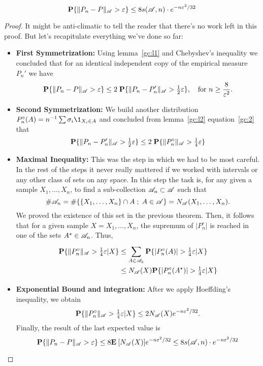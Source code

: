 \begin{theorem}\label{vc:inequality}
 \[\P\{\|P_n-P\|_{\AA} > \varepsilon\} \leq 8 s(\AA, n) \cdot e^{-n \varepsilon^2 / 32} \] 
\end{theorem}
\begin{proof}
    It might be anti-climatic to tell the reader that there's no work left in this proof. But let's recapitulate everything we've done so far:
    \begin{itemize}
        \item \textbf{First Symmetrization:} Using {lemma}~\ref{gc:l1} and Chebyshev's inequality we concluded that for an identical independent copy of the empirical measure $P_n'$ we have
        \[ \P\{\|P_n - P\|_\AA > \varepsilon\} \leq 2 \; \P\{\|P_n-P_n'\|_\AA > \tfrac{1}{2}\varepsilon\},\hspace*{1em}\text{for } n \geq \frac{8}{\varepsilon^2}.\] 
        \item \textbf{Second Symmetrization:} We build another distribution $P_n^\circ(A) = n^{-1}\sum \sigma_i \1_{X_i \in A} $ and concluded from {lemma}~\ref{gc:l2} equation~\ref{gc:2} that
        \[ \P\{\|P_n-P_n'\|_\AA > \tfrac{1}{2}\varepsilon\} \leq 2\; \P\{\|P_n^\circ\|_\AA > \tfrac{1}{4}\varepsilon\}   \]
        \item \textbf{Maximal Inequality:} This was the step in which we had to be most careful. In the rest of the steps it never really mattered if we worked with intervals or any other class of sets on any space. In this step the task is, for any given a sample $X_1, \ldots, X_n$, to find a sub-collection $\AA_n \subset \AA$ such that
        \[ \#\AA_n = \#\{\{X_1,\ldots,X_n\}\cap A \; ;\; A\in\AA\} = N_\AA(X_1,\ldots, X_n).\] 
        We proved the existence of this set in the previous theorem. Then, it follows that for a given sample $X = X_1,\ldots, X_n$, the supremum of $|P_n^\circ|$ is reached in one of the sets $A^\star \in \AA_n$. Thus,
        \[ \everymath{\displaystyle}\arraycolsep=1.4pt\def\arraystretch{1.5}
        \begin{array}{rcl}
            \P\{\|P_n^\circ\|_\AA > \tfrac{1}{4}\varepsilon | X\} & \leq & \sum_{A\in \AA_k}\P\{|P_n^\circ(A)| > \tfrac{1}{4}\varepsilon | X\} \\
            &\leq& N_\AA(X) \P\{|P_n^\circ(A^\star)| > \tfrac{1}{4}\varepsilon | X\}
       \end{array}
        \]
        \item \textbf{Exponential Bound and integration:} After we apply Hoeffding's inequality, we obtain
        \[ \P\{\|P_n^\circ\|_\AA > \tfrac{1}{4}\varepsilon | X\} \leq 2 N_\AA(X) e^{-n\varepsilon^2/32}.\]
        Finally, the result of the last expected value is 
         \[ \P\{\|P_n-P\|_\AA > \varepsilon\} \leq 8 \E[N_\AA(X)] e^{-n\varepsilon^2/32} \leq 8 s(\AA, n) \cdot e^{-n \varepsilon^2 / 32} \] 
    \end{itemize}
\end{proof}

